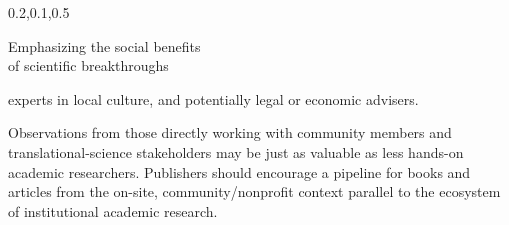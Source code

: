 \begin{frame}{}
{\begin{center}
\begin{minipage}{\textwidth}
{\begin{minipage}{\textwidth}
\begin{lightquadblockc}{0.2,0.1,0.5}{\parbox{21cm}{\vspace*{10pt}\centering Emphasizing the social benefits %
\\of scientific breakthroughs\vspace*{10pt}}}
\begin{minipage}{1.1\textwidth}
{\begin{description}
experts in local culture, and potentially legal or economic advisers.\vspace{10pt}%
\item[Scholarship \q{\textsl{en situ}}]  Observations from those 
directly working with community members and translational-science stakeholders 
may be just as valuable as less hands-on academic researchers.  Publishers 
should encourage a pipeline for books and articles from the on-site, 
community/nonprofit context parallel to the ecosystem of institutional academic research.     
\vspace{.75em}  
\end{description}}\end{minipage}
\end{lightquadblockc}
\end{minipage}}


\end{minipage}
\end{center}
}

\end{frame}

